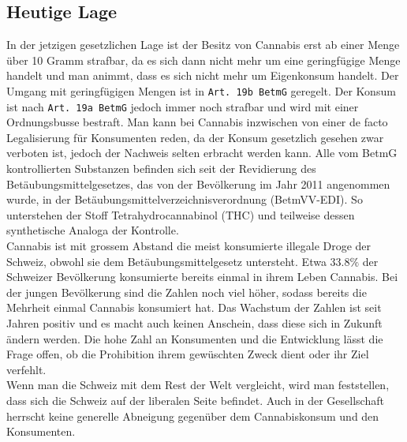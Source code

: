 \documentclass[../main.tex]{subfiles}
\begin{document}
	 \subsection{Heutige Lage}
	 In der jetzigen gesetzlichen Lage ist der Besitz von Cannabis erst ab einer Menge über 10 Gramm strafbar, da es sich dann nicht mehr um eine geringfügige Menge handelt und man animmt, dass es sich nicht mehr um Eigenkonsum handelt.
	 Der Umgang mit geringfügigen Mengen ist in \texttt{Art. 19b BetmG} geregelt.
	 Der Konsum ist nach \texttt{Art. 19a BetmG} jedoch immer noch strafbar und wird mit einer Ordnungsbusse bestraft. 
	 Man kann bei Cannabis inzwischen von einer de facto Legalisierung für Konsumenten reden, da der Konsum gesetzlich gesehen zwar verboten ist, jedoch der Nachweis selten erbracht werden kann. 
	 Alle vom BetmG kontrollierten Substanzen befinden sich seit der Revidierung des Betäubungsmittelgesetzes, das von der Bevölkerung im Jahr 2011 angenommen wurde, in der Betäubungsmittelverzeichnisverordnung (BetmVV-EDI). 
	 So unterstehen der Stoff Tetrahydrocannabinol (THC) und teilweise dessen synthetische Analoga der Kontrolle.\\
	 
	 \noindent
	 Cannabis ist mit grossem Abstand die meist konsumierte illegale Droge der Schweiz, obwohl sie dem Betäubungsmittelgesetz untersteht. 
	 Etwa $33.8\%$ der Schweizer Bevölkerung \cite{gmel} konsumierte bereits einmal in ihrem Leben Cannabis. 
	 Bei der jungen Bevölkerung sind die Zahlen noch viel höher, sodass bereits die Mehrheit einmal Cannabis konsumiert hat. 
	 Das Wachstum der Zahlen ist seit Jahren positiv und es macht auch keinen Anschein, dass diese sich in Zukunft ändern werden.
	 Die hohe Zahl an Konsumenten und die Entwicklung lässt die Frage offen, ob die Prohibition ihrem gewüschten Zweck dient oder ihr Ziel verfehlt.\\
	 
	 \noindent
	 Wenn man die Schweiz mit dem Rest der Welt vergleicht, wird man feststellen, dass sich die Schweiz auf der liberalen Seite befindet.
	 Auch in der Gesellschaft herrscht keine generelle Abneigung gegenüber dem Cannabiskonsum und den Konsumenten.	 
	 
	
\end{document}
